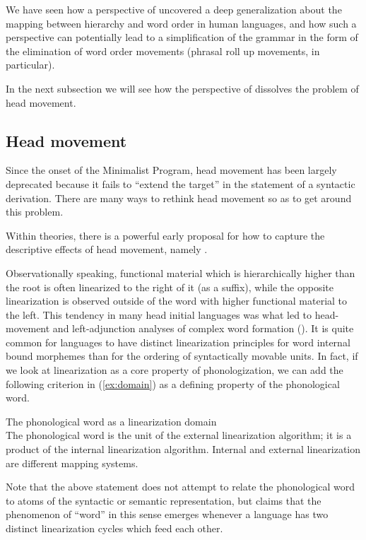 \documentclass[output=paper,colorlinks,citecolor=brown]{langscibook}
\begin{document}
We have seen how a perspective of  uncovered a deep generalization about the mapping between hierarchy and word order in human languages, and how such a perspective can potentially lead to a simplification of the grammar in the form of the elimination of word order movements (phrasal roll up movements, in particular). 

In the next subsection we will see how the perspective of  dissolves the problem of head movement.

\subsection{Head movement} 
 
Since the onset of the Minimalist Program, head movement has been largely deprecated because it fails to “extend the target” in the statement of a syntactic derivation. There are many ways to rethink head movement so as to get around this problem.

Within  theories, there is a powerful early proposal for how to capture the descriptive effects of head movement, namely  .

Observationally speaking, functional material which is hierarchically higher than the root is often linearized to the right of it (as a suffix), while the opposite linearization is observed outside of the word with higher functional material to the left. This tendency in many head initial languages was what led to head-movement and left-adjunction analyses of complex word formation (\citealt{baker85mp}).  It is quite common for languages to have distinct linearization principles for word internal bound morphemes than for the ordering of syntactically movable units. In fact, if we look at linearization as a core property of phonologization, we can add the following 
criterion  in (\ref{ex:domain}) as a defining property of the phonological  word.

\eanoraggedright\label{ex:domain}
The phonological word as a linearization domain\smallskip\\
The phonological word is the unit of the external linearization algorithm; it is a product of the internal linearization algorithm. Internal and external linearization are different mapping systems.
\z

\noindent Note that the above statement does not attempt to relate the phonological word to atoms of the syntactic or semantic representation, but claims that the phenomenon of “word” in this sense  emerges whenever a language has two distinct linearization cycles which feed each other.
\end{document}

